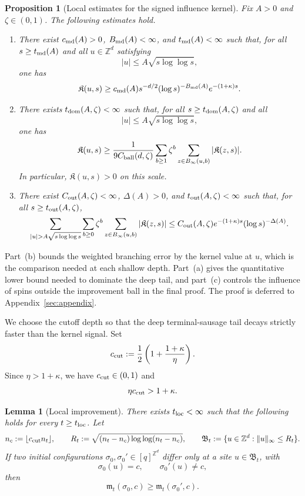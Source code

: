 \documentclass[letterpaper,11pt,reqno]{amsart}
\newtheorem{lemma}[thm]{Lemma}
\newtheorem{prop}[thm]{Proposition}
\theoremstyle{definition}
\newcommand{\IK}{\mathfrak{K}}
\begin{document}
\begin{prop}[Local estimates for the signed influence kernel]\label{prop:local-kernel-input}
Fix \(A>0\) and \(\zeta\in(0,1)\). The following estimates hold.

\begin{enumerate}
\item[\rm(a)] There exist \(c_{\rm md}(A)>0\), \(B_{\rm md}(A)<\infty\), and
\(t_{\rm md}(A)<\infty\) such that, for all \(s\ge t_{\rm md}(A)\) and all
\(u\in\mathbb Z^d\) satisfying
\[
|u|\le A\sqrt{s\log\log s},
\]
one has
\[
\IK(u,s)
\ge
c_{\rm md}(A)s^{-d/2}(\log s)^{-B_{\rm md}(A)}
e^{-(1+\kappa)s}.
\]

\item[\rm(b)] There exists \(t_{\rm dom}(A,\zeta)<\infty\) such that, for all
\(s\ge t_{\rm dom}(A,\zeta)\) and all
\[
|u|\le A\sqrt{s\log\log s},
\]
one has
\[
\IK(u,s)
\ge
\frac{1}{9C_{\rm ball}(d,\zeta)}
\sum_{b\ge1}\zeta^b
\sum_{z\in B_\infty(u,b)}|\IK(z,s)|.
\]
In particular, \(\IK(u,s)>0\) on this scale.

\item[\rm(c)] There exist \(C_{\rm out}(A,\zeta)<\infty\), \(\Delta(A)>0\), and
\(t_{\rm out}(A,\zeta)<\infty\) such that, for all \(s\ge t_{\rm out}(A,\zeta)\),
\[
\sum_{|u|>A\sqrt{s\log\log s}}
\sum_{b\ge0}\zeta^b
\sum_{z\in B_\infty(u,b)}|\IK(z,s)|
\le
C_{\rm out}(A,\zeta)e^{-(1+\kappa)s}(\log s)^{-\Delta(A)}.
\]
\end{enumerate}
\end{prop}
Part~(b) bounds the weighted branching error by the kernel value at \(u\), which is the comparison
needed at each shallow depth. Part~(a) gives the quantitative lower bound needed to dominate the
deep tail, and part~(c) controls the influence of spins outside the improvement ball in the final
proof. The proof is deferred to Appendix~\ref{sec:appendix}.

We choose the cutoff depth so that the deep terminal-sausage tail decays strictly faster than the
kernel signal. Set
\begin{equation}\label{eq:ccut-def}
c_{\rm cut}
:=
\frac12\left(1+\frac{1+\kappa}{\eta}\right).
\end{equation}
Since \(\eta>1+\kappa\), we have \(c_{\rm cut}\in(0,1)\) and
\[
\eta c_{\rm cut}>1+\kappa.
\]

\begin{lemma}[Local improvement]\label{lem:local-improvement}
There exists \(t_{\rm loc}<\infty\) such that the following holds for every \(t\ge t_{\rm loc}\).
Let
\[
n_c:=\lfloor c_{\rm cut}n_t\rfloor,
\qquad
R_t:=\sqrt{(n_t-n_c)\log\log(n_t-n_c)},
\qquad
\mathfrak B_t:=\{u\in\mathbb Z^d:\|u\|_\infty\le R_t\}.
\]
If two initial configurations \(\sigma_0,\sigma_0'\in[q]^{\mathbb Z^d}\) differ only at a site
\(u\in\mathfrak B_t\), with
\[
\sigma_0(u)=c,
\qquad
\sigma_0'(u)\neq c,
\]
then
\[
\mathfrak m_t(\sigma_0,c)\ge \mathfrak m_t(\sigma_0',c).
\]
\end{lemma}
\end{document}
